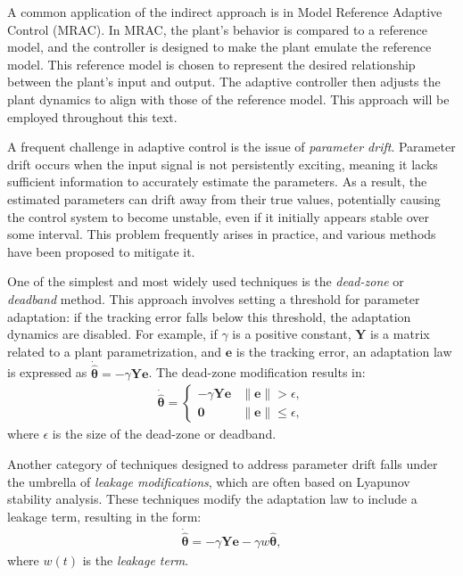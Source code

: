 A common application of the indirect approach is in Model Reference Adaptive Control (MRAC). In MRAC, the plant's behavior is compared to a reference model, and the controller is designed to make the plant emulate the reference model. This reference model is chosen to represent the desired relationship between the plant's input and output. The adaptive controller then adjusts the plant dynamics to align with those of the reference model. This approach will be employed throughout this text.

A frequent challenge in adaptive control is the issue of \emph{parameter drift}. Parameter drift occurs when the input signal is not persistently exciting, meaning it lacks sufficient information to accurately estimate the parameters. As a result, the estimated parameters can drift away from their true values, potentially causing the control system to become unstable, even if it initially appears stable over some interval. This problem frequently arises in practice, and various methods have been proposed to mitigate it.


One of the simplest and most widely used techniques is the \emph{dead-zone} or \emph{deadband} method. This approach involves setting a threshold for parameter adaptation: if the tracking error falls below this threshold, the adaptation dynamics are disabled. For example, if $\gamma$ is a positive constant, $\mathbf{Y}$ is a matrix related to a plant parametrization, and $\mathbf{e}$ is the tracking error, an adaptation law is expressed as $\dot{\widehat{\boldsymbol{\theta}}} = -\gamma\mathbf{Y}\mathbf{e}$. The dead-zone modification results in:
\begin{align*}
    \dot{\widehat{\boldsymbol{\theta}}} = \begin{cases}
        -\gamma\mathbf{Y}\mathbf{e} &\|\mathbf{e}\| > \epsilon,\\
        \mathbf{0} & \|\mathbf{e}\| \le \epsilon,
    \end{cases}
\end{align*}
where $\epsilon$ is the size of the dead-zone or deadband.

Another category of techniques designed to address parameter drift falls under the umbrella of \emph{leakage modifications}, which are often based on Lyapunov stability analysis. These techniques modify the adaptation law to include a leakage term, resulting in the form:
\begin{align}
    \dot{\widehat{\boldsymbol{\theta}}} = -\gamma\mathbf{Y}\mathbf{e} - \gamma w\widehat{\boldsymbol{\theta}},
\end{align}
where $w(t)$ is the \emph{leakage term}.

